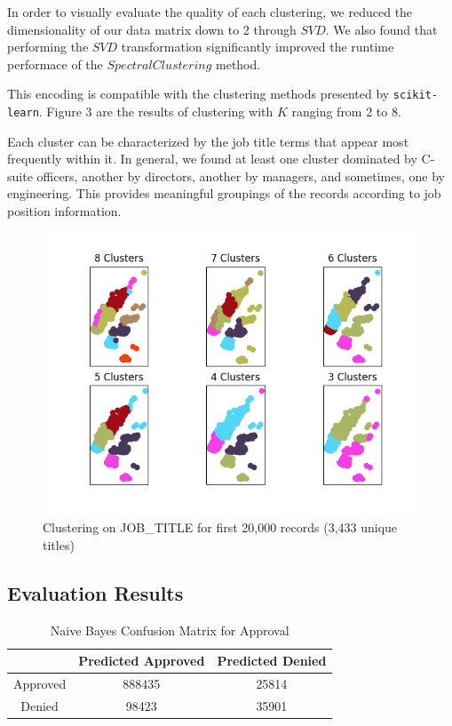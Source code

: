 \documentclass[sigconf]{acmart}
\begin{document}
In order to visually evaluate the quality of each clustering, we reduced the dimensionality of our
data matrix down to 2 through $SVD$. We also found that performing the $SVD$ transformation
significantly improved the runtime performace of the $SpectralClustering$ method.

This encoding is compatible with the clustering methods presented by \texttt{scikit-learn}. Figure 3
are the results of clustering with $K$ ranging from 2 to 8.

Each cluster can be characterized by the job title terms that appear most frequently within it. In
general, we found at least one cluster dominated by C-suite officers, another by directors, another
by managers, and sometimes, one by engineering. This provides meaningful groupings of the records
according to job position information.

\begin{figure}[ht]
  \centering
  \includegraphics[]{clustering}
  \caption{Clustering on JOB\_TITLE for first 20,000 records (3,433 unique titles)}
\end{figure}

\subsection{Evaluation Results}

\begin{table}[h]
    \caption{Naive Bayes Confusion Matrix for Approval}
    \centering
    \begin{tabular}{c| c |c}
        &Predicted Approved&Predicted Denied\\
        \hline
        Approved& 888435& 25814\\
        Denied  & 98423 & 35901\\
    \end{tabular}
\end{table}
\end{document}
